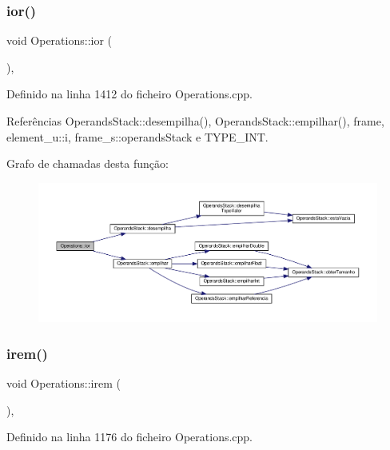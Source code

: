 \subsubsection{\texorpdfstring{ior()}{ior()}}
{\footnotesize\ttfamily void Operations\+::ior (\begin{DoxyParamCaption}{ }\end{DoxyParamCaption})\hspace{0.3cm}{\ttfamily [static]}, {\ttfamily [private]}}



Definido na linha 1412 do ficheiro Operations.\+cpp.



Referências Operands\+Stack\+::desempilha(), Operands\+Stack\+::empilhar(), frame, element\+\_\+u\+::i, frame\+\_\+s\+::operands\+Stack e T\+Y\+P\+E\+\_\+\+I\+NT.

Grafo de chamadas desta função\+:\nopagebreak
\begin{figure}[H]
\begin{center}
\leavevmode
\includegraphics[width=350pt]{classOperations_aaa890c310bc7a93e97b2c5004df94e70_cgraph}
\end{center}
\end{figure}
\mbox{\label{classOperations_a510bd2d155695861597a4413b44565bc}} 
\subsubsection{\texorpdfstring{irem()}{irem()}}
{\footnotesize\ttfamily void Operations\+::irem (\begin{DoxyParamCaption}{ }\end{DoxyParamCaption})\hspace{0.3cm}{\ttfamily [static]}, {\ttfamily [private]}}



Definido na linha 1176 do ficheiro Operations.\+cpp.



